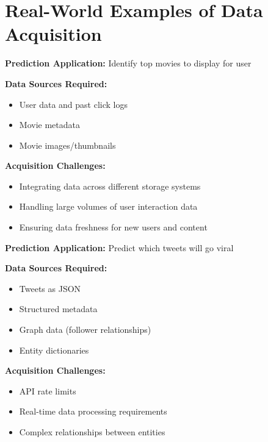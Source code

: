 \documentclass[12pt]{article}
\begin{document}
\section{Real-World Examples of Data Acquisition}

\begin{tcolorbox}[colback=blue!5!white,colframe=blue!75!black,title=Example: Recommendation System-Netflix]
\textbf{Prediction Application:} Identify top movies to display for user

\textbf{Data Sources Required:}
\begin{itemize}
    \item User data and past click logs
    \item Movie metadata
    \item Movie images/thumbnails
\end{itemize}

\textbf{Acquisition Challenges:}
\begin{itemize}
    \item Integrating data across different storage systems
    \item Handling large volumes of user interaction data
    \item Ensuring data freshness for new users and content
\end{itemize}
\end{tcolorbox}

\begin{tcolorbox}[colback=blue!5!white,colframe=blue!75!black,title=Example: Social Media Analytics]
\textbf{Prediction Application:} Predict which tweets will go viral

\textbf{Data Sources Required:}
\begin{itemize}
    \item Tweets as JSON
    \item Structured metadata
    \item Graph data (follower relationships)
    \item Entity dictionaries
\end{itemize}

\textbf{Acquisition Challenges:}
\begin{itemize}
    \item API rate limits
    \item Real-time data processing requirements
    \item Complex relationships between entities
\end{itemize}
\end{tcolorbox}
\end{document}
